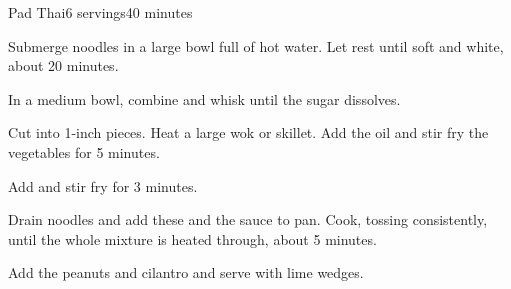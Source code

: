 \documentclass[../Cookbook.tex]{subfiles}
\begin{document}
\begin{recipe}{Pad Thai}{6 servings}{40 minutes}

Submerge noodles in a large bowl full of hot water. Let rest until soft and white, about 20 minutes.

In a medium bowl, combine and whisk until the sugar dissolves.

Cut into 1-inch pieces.
Heat a large wok or skillet. Add the oil and stir fry the vegetables for 5 minutes.

Add and stir fry for 3 minutes.

Drain noodles and add these and the sauce to pan. Cook, tossing consistently, until the whole mixture is heated through, about 5 minutes.

Add the peanuts and cilantro and serve with lime wedges.

\end{recipe}
\end{document}
